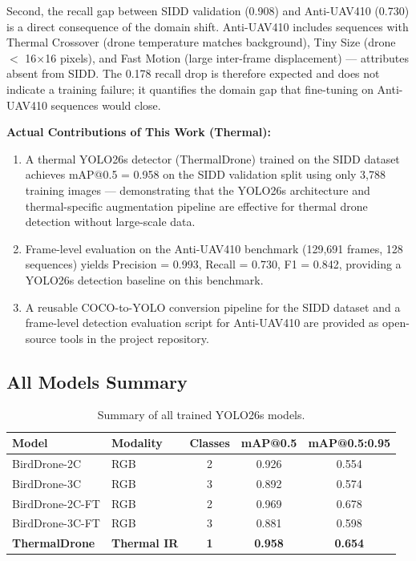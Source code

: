 \documentclass[12pt,a4paper]{report}
\begin{document}
Second, the recall gap between SIDD validation (0.908) and Anti-UAV410
(0.730) is a direct consequence of the domain shift. Anti-UAV410 includes
sequences with Thermal Crossover (drone temperature matches background),
Tiny Size (drone $<$ 16$\times$16 pixels), and Fast Motion (large
inter-frame displacement) --- attributes absent from SIDD. The 0.178
recall drop is therefore expected and does not indicate a training failure;
it quantifies the domain gap that fine-tuning on Anti-UAV410 sequences
would close.

\textbf{Actual Contributions of This Work (Thermal):}
\begin{enumerate}
  \item A thermal YOLO26s detector (ThermalDrone) trained on the SIDD
        dataset achieves mAP@0.5 = 0.958 on the SIDD validation split
        using only 3,788 training images --- demonstrating that the
        YOLO26s architecture and thermal-specific augmentation pipeline
        are effective for thermal drone detection without large-scale data.
  \item Frame-level evaluation on the Anti-UAV410 benchmark (129,691 frames,
        128 sequences) yields Precision = 0.993, Recall = 0.730, F1 = 0.842,
        providing a YOLO26s detection baseline on this benchmark.
  \item A reusable COCO-to-YOLO conversion pipeline for the SIDD dataset
        and a frame-level detection evaluation script for Anti-UAV410 are
        provided as open-source tools in the project repository.
\end{enumerate}

\subsection{All Models Summary}

\begin{table}[H]
\centering
\caption{Summary of all trained YOLO26s models.}
\label{tab:all_models}
\begin{tabular}{|l|l|c|c|c|}
\hline
\textbf{Model} & \textbf{Modality} & \textbf{Classes} & \textbf{mAP@0.5} & \textbf{mAP@0.5:0.95} \\
\hline
BirdDrone-2C    & RGB     & 2 & 0.926 & 0.554 \\
\hline
BirdDrone-3C    & RGB     & 3 & 0.892 & 0.574 \\
\hline
BirdDrone-2C-FT & RGB     & 2 & 0.969 & 0.678 \\
\hline
BirdDrone-3C-FT & RGB     & 3 & 0.881 & 0.598 \\
\hline
\textbf{ThermalDrone} & \textbf{Thermal IR} & \textbf{1} & \textbf{0.958} & \textbf{0.654} \\
\hline
\end{tabular}
\end{table}
\end{document}
